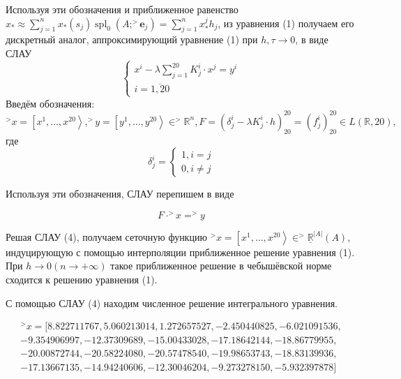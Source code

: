 \documentclass[14pt,a4paper]{scrartcl}
\begin{document}
Используя эти обозначения и приближенное равенство \\${x_{*} \approx \sum_{j=1}^{n} x_{*}\left(s_{j}\right) \operatorname{spl}_{0}\left(A ;^{>} \mathbf{e}_{j}\right)=\sum_{j=1}^{n} x_{*}^{j} h_{j}}$, из уравнения (1) получаем его дискретный аналог, аппроксимирующий уравнение (1) при $h, \tau \rightarrow 0$, в виде СЛАУ 
\begin{equation}
\left\{\begin{array}{l}{x^{i}-\lambda \sum\limits_{j=1}^{20} K_{j}^{i} \cdot x^{j}=y^{i}} \\ {i=\overline{1,20}}\end{array}\right.
\end{equation}
Введём обозначения:
\begin{equation}
^>x=\left[x^{1}, \ldots, x^{20}\right\rangle,^>y=\left[y^{1}, \ldots, y^{20}\right\rangle \in ^>\mathbb{R}^{n}, F=\left(\delta_{j}^{i}-\lambda K_{j}^{i} \cdot h\right)_{20}^{20}=\left(f_{j}^{i}\right)_{20}^{20} \in L(\mathbb{R}, 20),
\end{equation}
где
\begin{equation*}
\delta_{j}^{i}=\left\{\begin{array}{l}{1, i=j} \\ {0, i \neq j}\end{array}\right.
\end{equation*}

Используя эти обозначения, СЛАУ перепишем в виде 

\begin{equation}
	F\cdot ^>x = ^>y
\end{equation}

Решая СЛАУ (4), получаем сеточную функцию $^>x=\left[x^{1}, \ldots, x^{20}\right\rangle \in ^>\underline{\mathbb{R}}^{|A|}(A)$, индуцирующую с помощью интерполяции приближенное решение уравнения (1). При $h \longrightarrow 0 (n \longrightarrow +\infty)$ такое приближенное решение в чебышёвской норме сходится к решению уравнения (1).

С помощью СЛАУ (4) находим численное решение интегрального уравнения.

\begin{align*}
^>x = [ 8.822711767, 5.060213014, 1.272657527,- 2.450440825,- 6.021091536,\\-
9.354906997,- 12.37309689,- 15.00433028,- 17.18642144,- 18.86779955,\\-
20.00872744,- 20.58224080,- 20.57478540,- 19.98653743,- 18.83139936,\\-
17.13667135,- 14.94240606,- 12.30046204,- 9.273278150,- 5.932397878]
\end{align*}
\end{document}
